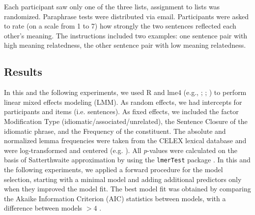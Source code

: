 \documentclass[output=paper]{langsci/langscibook}
\begin{document}
Each participant saw only one of the three lists, assignment to lists was randomized. Paraphrase tests were distributed via email. Participants were asked to rate (on a scale from 1 to 7) how strongly the two sentences reflected each other’s meaning. The instructions included two examples: one sentence pair with high meaning relatedness, the other sentence pair with low meaning relatedness. 

\subsection{Results}\largerpage

In this and the following experiments, we used R \citep{rCore:2012} and lme4 (e.g., \citealt{bates:2005}; \citealt{bates:2012}; \citealt{baayen:2008}) to perform linear mixed effects modeling (LMM). As random effects, we had intercepts for participants and items (i.e. sentences). As fixed effects, we included the factor Modification Type (idiomatic/associated/unrelated), the Sentence Closure of the idiomatic phrase, and the Frequency of the constituent. The absolute and normalized lemma frequencies were taken from the CELEX lexical database \citep{baayen:1993} and were log-transformed and centered (e.g. \citealt{winter:2013}). All \textit{p}-values were calculated on the basis of Satterthwaite approximation by using the \texttt{lmerTest} package \citep{kuznetsova:2015}. In this and the following experiments, we applied a forward procedure for the model selection, starting with a minimal model and adding additional predictors only when they improved the model fit. The best model fit was obtained by comparing the Akaike Information Criterion (AIC) statistics between models, with a difference between models $>4$ \citep{sakamoto:1986}. 

\begin{table}
\caption{Fixed effects of the predictors in the linear mixed-effect model for the paraphrase ratings in Experiment 1. \textit{Notes:} significance code: *** < 0.0001.\label{tab:linear}}
\end{table}
\end{document}
